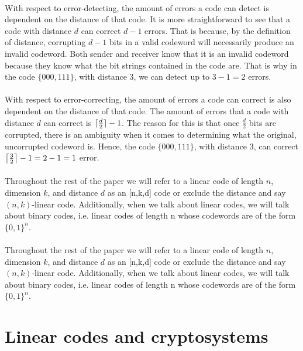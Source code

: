 \documentclass[12pt]{article}
\DeclarePairedDelimiter{\ceil}{\lceil}{\rceil}
\theoremstyle{definition}
\begin{document}
\paragraph{} With respect to error-detecting, the amount of errors a code can detect is dependent on the distance of that code.  It is more straightforward to see that a code with distance $d$ can correct $d-1$ errors.  That is because, by the definition of distance, corrupting $d-1$ bits in a valid codeword will necessarily produce an invalid codeword.  Both sender and receiver know that it is an invalid codeword because they know what the bit strings contained in the code are.  That is why in the code $\{000,111\}$, with distance 3, we can detect up to $3-1 = 2$ errors.  

\paragraph{} With respect to error-correcting, the amount of errors a code can correct is also dependent on the distance of that code.  The amount of errors that a code with distance $d$ can correct is $\ceil[\bigcap]{\frac{d}{2}} - 1$.  The reason for this is that once $\frac{d}{2}$ bits are corrupted, there is an ambiguity when it comes to determining what the original, uncorrupted codeword is.  Hence, the code $\{000,111\}$, with distance 3, can correct $\ceil[\big]{\frac{3}{2}}-1 = 2-1 = 1$ error.

\paragraph{} Throughout the rest of the paper we will refer to a linear code of length $n$, dimension $k$, and distance $d$ as an [n,k,d] code or exclude the distance and say $(n,k)$-linear code.  Additionally, when we talk about linear codes, we will talk about binary codes, i.e. linear codes of length n whose codewords are of the form $\{0,1\}^n$. 


\paragraph{} Throughout the rest of the paper we will refer to a linear code of length $n$, dimension $k$, and distance $d$ as an [n,k,d] code or exclude the distance and say $(n,k)$-linear code.  Additionally, when we talk about linear codes, we will talk about binary codes, i.e. linear codes of length n whose codewords are of the form $\{0,1\}^n$. 

\section{Linear codes and cryptosystems}
\end{document}
